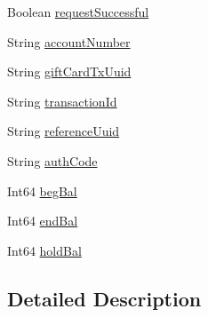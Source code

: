 \begin{DoxyCompactItemize}
\item 
Boolean \hyperlink{classcom_1_1clover_1_1sdk_1_1v3_1_1payments_1_1_gift_card_response_a5364e6c4cd85c51e26391be783c3da4b}{request\+Successful}
\item 
String \hyperlink{classcom_1_1clover_1_1sdk_1_1v3_1_1payments_1_1_gift_card_response_aa17be4f3efe32c545f45bb13261534f7}{account\+Number}
\item 
String \hyperlink{classcom_1_1clover_1_1sdk_1_1v3_1_1payments_1_1_gift_card_response_a86180e20154029f8fdba7c907140c419}{gift\+Card\+Tx\+Uuid}
\item 
String \hyperlink{classcom_1_1clover_1_1sdk_1_1v3_1_1payments_1_1_gift_card_response_a5ea7db0219832416ef3cbbfcb9e08515}{transaction\+Id}
\item 
String \hyperlink{classcom_1_1clover_1_1sdk_1_1v3_1_1payments_1_1_gift_card_response_a5bf51e95e74dc59d43fe22dd98fdcbc5}{reference\+Uuid}
\item 
String \hyperlink{classcom_1_1clover_1_1sdk_1_1v3_1_1payments_1_1_gift_card_response_a955fef586c9e5a30e91add99d4f28714}{auth\+Code}
\item 
Int64 \hyperlink{classcom_1_1clover_1_1sdk_1_1v3_1_1payments_1_1_gift_card_response_a1fa40f23e06b6fedbbbe1183d8e48f7f}{beg\+Bal}
\item 
Int64 \hyperlink{classcom_1_1clover_1_1sdk_1_1v3_1_1payments_1_1_gift_card_response_ababd9ea6bc9f9cc344a70353900749c2}{end\+Bal}
\item 
Int64 \hyperlink{classcom_1_1clover_1_1sdk_1_1v3_1_1payments_1_1_gift_card_response_a83025f4af03fa442dd5fd3d86d5c599a}{hold\+Bal}
\end{DoxyCompactItemize}


\subsection{Detailed Description}


